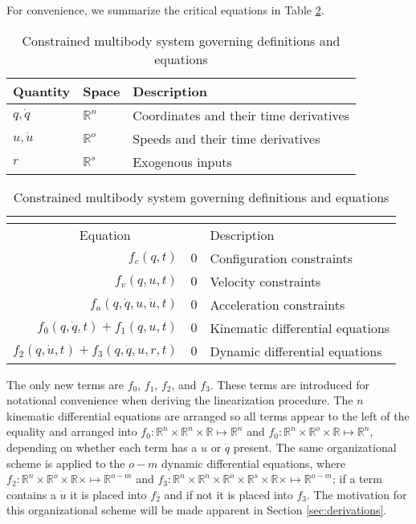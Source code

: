 For convenience, we summarize the critical equations in Table
\ref{table:assumptions}.
\begin{table}[htbp]
  \centering
  \begin{tabular}[c]{l l l}
    \toprule
    Quantity & Space & Description\\
    \midrule
    $q,\dot{q}$ & $\mathbb{R}^n$ & Coordinates and their time derivatives\\
    $u, \dot{u}$ & $\mathbb{R}^o$ & Speeds and their time derivatives\\
    $r$ & $\mathbb{R}^s$ & Exogenous inputs \\
    \bottomrule
  \end{tabular}
  \begin{tabular}[c]{r @{ $=$ } l l}
    \multicolumn{3}{c}{ } \\
    \toprule
    \multicolumn{2}{c}{Equation} & Description \\
    \midrule
    $f_{c}(q, t)$ & $0$ & Configuration constraints \\
    $f_{v}(q, u, t)$ & $0$ & Velocity constraints \\
    $f_{a}(q, \dot{q}, u, \dot{u}, t)$ & $0$ & Acceleration constraints \\
    $f_{0}(q, \dot{q}, t) + f_{1}(q, u, t)$ &
    $0$ & Kinematic differential equations \\
    $f_{2}(q, \dot{u}, t) + f_{3}(q, \dot{q}, u, r, t)$ & $0$ & Dynamic differential equations\\
    \bottomrule
  \end{tabular}
  \caption{Constrained multibody system governing definitions and equations}
  \label{table:assumptions}
\end{table}

The only new terms are $f_0$, $f_1$, $f_2$, and $f_3$. These terms are
introduced for notational convenience when deriving the linearization
procedure. The $n$ kinematic differential equations are arranged so all terms
appear to the left of the equality and arranged into
$f_0:\mathbb{R}^{n}\times\mathbb{R}^{n}\times\mathbb{R}\mapsto\mathbb{R}^n$ and
$f_0:\mathbb{R}^{n}\times\mathbb{R}^{o}\times\mathbb{R}\mapsto\mathbb{R}^n$,
depending on whether each term has a ${u}$ or $\dot{q}$ present. The same
organizational scheme is applied to the $o-m$ dynamic differential equations,
where
$f_2:\mathbb{R}^n\times\mathbb{R}^o\times\mathbb{R}\times\mapsto\mathbb{R}^{o-m}$
and
$f_3:\mathbb{R}^n\times\mathbb{R}^n\times\mathbb{R}^o\times\mathbb{R}^s\times\mathbb{R}\times\mapsto\mathbb{R}^{o-m}$;
if a term contains a $\dot{u}$ it is placed into $f_2$ and if not it is placed
into $f_3$. The motivation for this organizational scheme will be made apparent
in Section \ref{sec:derivations}.

